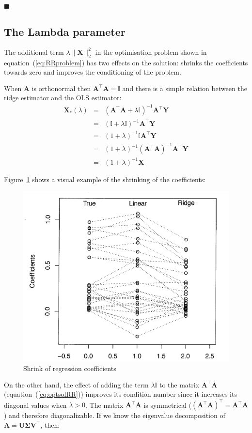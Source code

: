 $\blacksquare$

\subsection{The Lambda parameter}

The additional term $\lambda \|\mathbf{\mathbf{X}}\|_2^2$ in the optimisation
problem shown in equation~(\ref{eq:RRproblem}) has two effects on the solution:
shrinks the coefficients towards zero and improves the conditioning of the
problem.

When $\mathbf{A}$ is orthonormal then $\mathbf{A}^\top \mathbf{A} =\mathbb{I}$ and there is a simple relation between the ridge estimator and the OLS estimator:
\begin{eqnarray*}
\mathbf{X}_* (\lambda) &=& (\mathbf{A}^\top \mathbf{A}+\lambda \mathbb{I})^{-1}\mathbf{A}^\top \mathbf{Y} \\
 &=& (\mathbb{I} + \lambda \mathbb{I})^{-1} \mathbf{A}^\top \mathbf{Y} \\
 &=&(1+\lambda)^{-1} \mathbb{I} \mathbf{A}^\top \mathbf{Y} \\
 &=&(1+\lambda)^{-1} (\mathbf{A}^\top \mathbf{A})^{-1}\mathbf{A}^\top \mathbf{Y} \\
 &=&(1+\lambda)^{-1} \mathbf{X}
\end{eqnarray*}

Figure~\ref{fig:shrinks} shows a visual example of the shrinking of the
coefficients:

\begin{figure}[h!]
\includegraphics[width=0.5\linewidth]{img/shrinks}
\caption{Shrink of regression coefficients}
\label{fig:shrinks}
\end{figure}



On the other hand, the effect of adding the term $\lambda \mathbb{I}$
to the matrix $\mathbf{A}^\top \mathbf{A}$
(equation~(\ref{eq:optsolRR})) improves its condition number since it
increases its diagonal values when $\lambda > 0 $.  The matrix
$\mathbf{A}^\top \mathbf{A}$ is symmetrical ($(\mathbf{A}^\top
\mathbf{A})^\top = \mathbf{A}^\top \mathbf{A}$) and therefore
diagonalizable.  If we know the eigenvalue decomposition of $\mathbf{A}
= \mathbf{U\Sigma V^\top}$, then:

